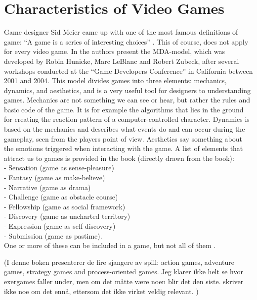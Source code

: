 \chapter{Characteristics of Video Games}
Game designer Sid Meier came up with one of the most famous definitions of game: “A game is a series of interesting choices” \cite{understandingvg}. This of course, does not apply for every video game. In \cite{understandingvg} the authors present the MDA-model, which was developed by Robin Hunicke, Marc LeBlanc and Robert Zubeck, after several workshops conducted at the “Game Developers Conference” in California between 2001 and 2004. This model divides games into three elements: mechanics, dynamics, and aesthetics, and is a very useful tool for designers to understanding games. Mechanics are not something we can see or hear, but rather the rules and basic code of the game. It is for example the algorithms that lies in the ground for creating the reaction pattern of a computer-controlled character. Dynamics is based on the mechanics and describes what events do and can occur during the gameplay, seen from the players point of view. Aesthetics say something about the emotions triggered when interacting with the game. A list of elements  that attract us to games is provided in the book (directly drawn from the book): \\
- Sensation (game as sense-pleasure)\\
- Fantasy (game as make-believe)\\
- Narrative (game as drama)\\
- Challenge (game as obstacle course)\\
- Fellowship (game as social framework)\\
- Discovery (game as uncharted territory)\\
- Expression (game as self-discovery)\\
- Submission (game as pastime).\\
One or more of these can be included in a game, but not all of them \cite{understandingvg}.

(I denne boken presenterer de fire sjangere av spill: action games, adventure games, strategy games and process-oriented games. Jeg klarer ikke helt se hvor exergames faller under, men om det måtte være noen blir det den siste. skriver ikke noe om det ennå, ettersom det ikke virket veldig relevant. )

